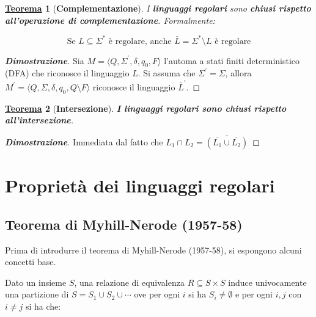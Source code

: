 \documentclass[a4paper]{article}
\newtheorem{theorem}{\textcolor{Red3}{\underline{Teorema}}}
\begin{document}
	\vspace{2em}

	\begin{theorem}[\textcolor{Red3}{\textbf{Complementazione}}]
		I \textbf{linguaggi regolari} sono \textbf{chiusi rispetto all'operazione di complementazione}. Formalmente:
		
		\begin{equation*}
			\text{Se } L \subseteq \Sigma^{*} \text{ è regolare, anche } \bar{L} = \Sigma^{*} \setminus L \text{ è regolare}
		\end{equation*}
	\end{theorem}
	\begin{proof}[\textcolor{Green4}{\textbf{Dimostrazione}}]
		Sia $M = \langle Q, \Sigma^{'}, \delta, q_{0}, F \rangle$ l'automa a stati finiti deterministico (DFA) che riconosce il linguaggio $L$. Si assuma che $\Sigma^{'} = \Sigma$, allora $M^{'} = \langle Q, \Sigma, \delta, q_{0}, Q \setminus F \rangle$ riconosce il linguaggio $\bar{L}^{'}$.
	\end{proof}

	\vspace{2em}

	\begin{theorem}[\textcolor{Red3}{\textbf{Intersezione}}]
		\textbf{I linguaggi regolari sono chiusi rispetto all'intersezione}.
	\end{theorem}
	\begin{proof}[\textcolor{Green4}{\textbf{Dimostrazione}}]
		Immediata dal fatto che $L_{1} \cap L_{2} = \overline{\left(\overline{L_{1}} \cup \overline{L_{2}}\right)}$
	\end{proof}

	\newpage
	
	\section{Proprietà dei linguaggi regolari}
	
	\subsection{Teorema di Myhill-Nerode (1957-58)}
	
	Prima di introdurre il teorema di Myhill-Nerode (1957-58), si espongono alcuni concetti base.\newline
	
	\noindent
	Dato un insieme $S$, una relazione di equivalenza $R \subseteq S \times S$ induce univocamente una partizione di $S = S_{1} \cup S_{2} \cup \cdots$ ove per ogni $i$ si ha $S_{i} \ne \emptyset$ e per ogni $i, j$ con $i \ne j$ si ha che:
	
\end{document}
